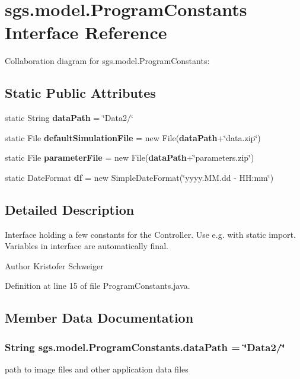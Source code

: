 \section{sgs.\-model.\-Program\-Constants Interface Reference}
\label{interfacesgs_1_1model_1_1_program_constants}


Collaboration diagram for sgs.\-model.\-Program\-Constants\-:
\subsection*{Static Public Attributes}
\begin{DoxyCompactItemize}
\item 
static String {\bf data\-Path} = \char`\"{}Data2/\char`\"{}
\item 
static File {\bf default\-Simulation\-File} = new File({\bf data\-Path}+\char`\"{}data.\-zip\char`\"{})
\item 
static File {\bf parameter\-File} = new File({\bf data\-Path}+\char`\"{}parameters.\-zip\char`\"{})
\item 
static Date\-Format {\bf df} = new Simple\-Date\-Format(\char`\"{}yyyy.\-M\-M.\-dd -\/ H\-H\-:mm\char`\"{})
\end{DoxyCompactItemize}


\subsection{Detailed Description}
Interface holding a few constants for the Controller. Use e.\-g. with static import. Variables in interface are automatically final.

\begin{DoxyAuthor}{Author}
Kristofer Schweiger 
\end{DoxyAuthor}


Definition at line 15 of file Program\-Constants.\-java.



\subsection{Member Data Documentation}
\subsubsection[{data\-Path}]{\setlength{\rightskip}{0pt plus 5cm}String sgs.\-model.\-Program\-Constants.\-data\-Path = \char`\"{}Data2/\char`\"{}\hspace{0.3cm}{\ttfamily [static]}}\label{interfacesgs_1_1model_1_1_program_constants_a6cd6295957c223371a34d455701d3e60}
path to image files and other application data files 

